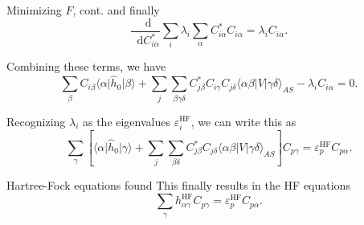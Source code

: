 \documentclass[UKenglish,aspectratio=169]{beamer}
\newcommand*\diff{\mathop{}\!\mathrm{d}}
\begin{document}
\begin{frame}{Minimizing $F$, cont.}
    and finally
    \begin{equation}
        \frac{\diff}{\diff C_{i \alpha}^*} \sum_{i} \lambda_i \sum_{\alpha} C_{i \alpha}^* C_{i \alpha} = \lambda_i C_{i \alpha}.
    \end{equation}

    \bigskip

    Combining these terms, we have
    \begin{equation}
        \sum_{\beta} C_{i \beta}
        \langle \alpha \vert \hat{h}_0 \vert \beta \rangle
        + \sum_j \sum_{\beta\gamma\delta} C_{j \beta}^* C_{i \gamma} C_{j \delta} \langle \alpha\beta \vert V \vert \gamma\delta \rangle_{AS}
        - \lambda_i C_{i \alpha} = 0.
    \end{equation}

    Recognizing $\lambda_i$ as the eigenvalues $\varepsilon_i^\mathrm{HF}$, we can write this as
    \begin{equation}
        \sum_{\gamma} \left[
            \langle \alpha \vert \hat{h}_0 \vert \gamma \rangle
            + \sum_j \sum_{\beta\delta} C_{j \beta}^*  C_{j \delta}
            \langle \alpha\beta \vert V \vert \gamma\delta \rangle_{AS}
        \right] C_{p \gamma}
        = \varepsilon_p^\mathrm{HF} C_{p \alpha}.
    \end{equation}
\end{frame}

\begin{frame}{Hartree-Fock equations found}
    This finally results in the HF equations
    \begin{equation}
        \sum_{\gamma} h_{\alpha\gamma}^\mathrm{HF} C_{p \gamma} = \varepsilon_p^\mathrm{HF} C_{p \alpha}.
    \end{equation}
\end{frame}
\end{document}
